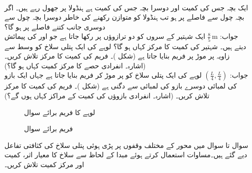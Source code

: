 \\
ایک بچہ جس کی کمیت  اور دوسرا بچہ جس کی کمیت  ہے ہنڈولا پر جھول رہے ہیں۔ اگر  بچہ چول سے  فاصلے پر ہو تب ہنڈولا کو متوازن رکھنے کی خاطر دوسرا بچہ چول سے دوسری جانب کتنے فاصلے پر ہو گا؟\\
جواب:\quad
$\tfrac{8}{5}\,\si{\meter}$
ایک شہتیر کے سروں کو دو  ترازوؤں پر رکھا جاتا ہے  جو  اور  کی پیمائش دیتے ہیں۔ شہتیر کی کمیت کا مرکز کہاں ہو گا؟
لوہے کی ایک پتلی سلاخ کو وسط سے  زاویہ پر موڑ پر فریم بنایا جاتا ہے (شکل )۔ فریم کی کمیت کا مرکز تلاش کریں۔ (اشارہ۔ انفرادی حصے کا مرکز کمیت کہاں ہو گا؟)\\
جواب:\quad
$(\tfrac{L}{4},\tfrac{L}{4})$
لوہے کی ایک پتلی سلاخ کو  پر موڑ کر فریم بنایا جاتا ہے جہاں ایک بازو کی لمبائی دوسرے بازو کی لمبائی سے دگنی ہے (شکل )۔ فریم کی کمیت کا مرکز تلاش کریں۔ (اشارہ۔ انفرادی بازوؤں کی کمیت کے مراکز کہاں ہوں گے؟) 
\begin{figure}
\centering
\begin{minipage}{0.45\textwidth}
\centering
{}
\caption{لوہے کا فریم برائے سوال }
\label{شکل_سوال_تکمل_استعمال_سلاخ_مڑا_الف}
\end{minipage}\hfill
\begin{minipage}{0.45\textwidth}
\centering
{}
\caption{فریم برائے سوال }
\label{شکل_سوال_تکمل_استعمال_سلاخ_مڑا_ب}
\end{minipage}
\end{figure}
سوال  تا سوال  میں محور  کے مختلف وقفوں پر پڑی ہوئی پتلی سلاخ کی کثافتی تفاعل دیے گئے ہیں۔مساوات  استعمال کرتے ہوئے مبدا کے لحاظ سے سلاخ کا معیار اثر، کمیت اور مرکز کمیت تلاش کریں۔

